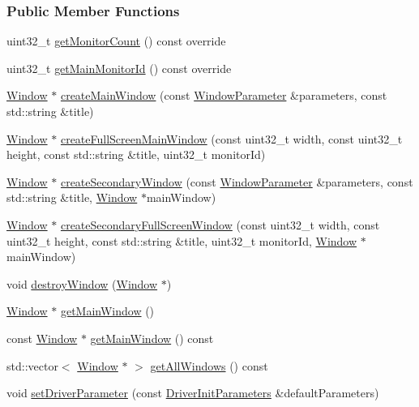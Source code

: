 \subsubsection*{Public Member Functions}
\begin{DoxyCompactItemize}
\item 
uint32\+\_\+t \hyperlink{a00090_a40ee7fc65955826dede09f35e3aa4815}{get\+Monitor\+Count} () const  override
\item 
uint32\+\_\+t \hyperlink{a00090_a02afdb8c94a0dc9c8e052901e44676ab}{get\+Main\+Monitor\+Id} () const  override
\item 
\hyperlink{a00082}{Window} $\ast$ \hyperlink{a00087_a863ac648c2c2a93a57c4a898fb176718}{create\+Main\+Window} (const \hyperlink{a00091}{Window\+Parameter} \&parameters, const std\+::string \&title)
\item 
\hyperlink{a00082}{Window} $\ast$ \hyperlink{a00087_a9c2adc3003612cafb99fd7a156bc9655}{create\+Full\+Screen\+Main\+Window} (const uint32\+\_\+t width, const uint32\+\_\+t height, const std\+::string \&title, uint32\+\_\+t monitor\+Id)
\item 
\hyperlink{a00082}{Window} $\ast$ \hyperlink{a00087_afc8f953d7aa1e2822b8ced1e5b855ab8}{create\+Secondary\+Window} (const \hyperlink{a00091}{Window\+Parameter} \&parameters, const std\+::string \&title, \hyperlink{a00082}{Window} $\ast$main\+Window)
\item 
\hyperlink{a00082}{Window} $\ast$ \hyperlink{a00087_a8d3b6392e5389e7e5706f92ceed96fa0}{create\+Secondary\+Full\+Screen\+Window} (const uint32\+\_\+t width, const uint32\+\_\+t height, const std\+::string \&title, uint32\+\_\+t monitor\+Id, \hyperlink{a00082}{Window} $\ast$main\+Window)
\item 
void \hyperlink{a00087_aecfb9aa6471ecf82e5c76a96440c275c}{destroy\+Window} (\hyperlink{a00082}{Window} $\ast$)
\item 
\hyperlink{a00082}{Window} $\ast$ \hyperlink{a00087_a7ccb3265cab90117a4face1c5ebb5e29}{get\+Main\+Window} ()
\item 
const \hyperlink{a00082}{Window} $\ast$ \hyperlink{a00087_aa59c328988c32399328f8f38c5210275}{get\+Main\+Window} () const 
\item 
std\+::vector$<$ \hyperlink{a00082}{Window} $\ast$ $>$ \hyperlink{a00087_a9aac4dcdd92008cd8602b7456be6260a}{get\+All\+Windows} () const 
\item 
void \hyperlink{a00087_a9aaa765ab360c7093dd1f1d3f5f3d621}{set\+Driver\+Parameter} (const \hyperlink{a00028}{Driver\+Init\+Parameters} \&default\+Parameters)
\end{DoxyCompactItemize}
